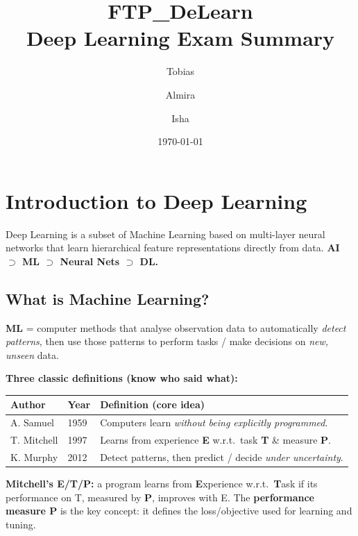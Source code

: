 \documentclass[10pt,a4paper]{article}
\title{\textbf{FTP\_DeLearn}\\Deep Learning Exam Summary}
\author{Tobias \and Almira \and Isha}
\date{\today}
\begin{document}
	
	\maketitle
	\tableofcontents
	\newpage
	
	\section{Introduction to Deep Learning}

	\begin{definitionbox}
		Deep Learning is a subset of Machine Learning based on multi-layer neural networks that learn hierarchical feature representations directly from data. \textbf{AI $\supset$ ML $\supset$ Neural Nets $\supset$ DL.}
	\end{definitionbox}

	\subsection{What is Machine Learning?}

	\begin{definitionbox}
		\textbf{ML} = computer methods that analyse observation data to automatically \emph{detect patterns}, then use those patterns to perform tasks / make decisions on \emph{new, unseen} data.
	\end{definitionbox}

	\textbf{Three classic definitions (know who said what):}
	\begin{center}
		\begin{tabular}{lll}
			\toprule
			Author & Year & Definition (core idea) \\
			\midrule
			A. Samuel  & 1959 & Computers learn \emph{without being explicitly programmed}. \\
			T. Mitchell & 1997 & Learns from experience \textbf{E} w.r.t.\ task \textbf{T} \& measure \textbf{P}. \\
			K. Murphy  & 2012 & Detect patterns, then predict / decide \emph{under uncertainty}. \\
			\bottomrule
		\end{tabular}
	\end{center}

	\begin{importantbox}
		\textbf{Mitchell's E/T/P:} a program learns from \textbf{E}xperience w.r.t.\ \textbf{T}ask if its performance on T, measured by \textbf{P}, improves with E. The \textbf{performance measure P} is the key concept: it defines the loss/objective used for learning and tuning.
	\end{importantbox}
\end{document}
